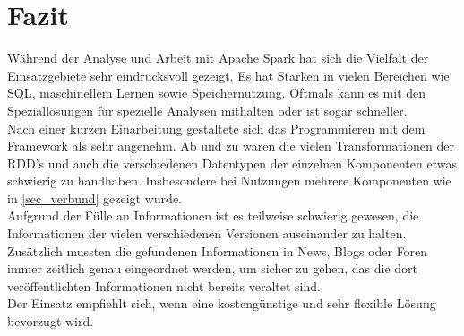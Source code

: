 \newpage
\chapter{Fazit} 

Während der Analyse und Arbeit mit Apache Spark hat sich die Vielfalt der Einsatzgebiete sehr eindrucksvoll gezeigt. Es hat Stärken in vielen Bereichen wie SQL, maschinellem Lernen sowie Speichernutzung. Oftmals kann es mit den Speziallösungen für spezielle Analysen mithalten oder ist sogar schneller.\\

\noindent
Nach einer kurzen Einarbeitung gestaltete sich das Programmieren mit dem Framework als sehr angenehm. Ab und zu waren die vielen Transformationen der RDD's und auch die verschiedenen Datentypen der einzelnen Komponenten etwas schwierig zu handhaben. Insbesondere bei Nutzungen mehrere Komponenten wie in \autoref{sec_verbund} gezeigt wurde.\\

\noindent
Aufgrund der Fülle an Informationen ist es teilweise schwierig gewesen, die Informationen der vielen verschiedenen Versionen auseinander zu halten. Zusätzlich mussten die gefundenen Informationen in News, Blogs oder Foren immer zeitlich genau eingeordnet werden, um sicher zu gehen, das die dort veröffentlichten Informationen nicht bereits veraltet sind.\\

\noindent
Der Einsatz empfiehlt sich, wenn eine kostengünstige und sehr flexible Lösung bevorzugt wird.